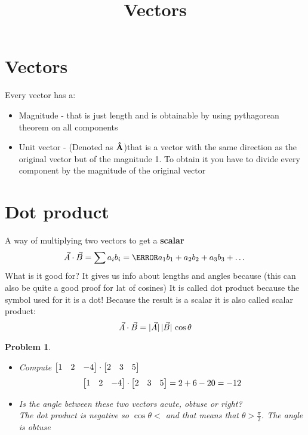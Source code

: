 \documentclass{article}
\begin{document}
    \title{Vectors}
    \maketitle


    \section{Vectors}

    Every vector has a:
    \begin{itemize}
        \item Magnitude - that is just length and is obtainable by using pythagorean theorem on all components
        \item Unit vector - (Denoted as $\vu{A}$)that is a vector with the same direction as the original vector but of the magnitude 1. To obtain it you have to divide every component by the magnitude of the original vector
    \end{itemize}

    \section{Dot product}

    A way of multiplying two vectors to get a \textbf{scalar}
    \[\vec{A}\cdot\vec{B}=\sum{a_ib_i}=\cancel{a_1b_1}+a_2b_2+a_3b_3+\dots\]
    What is it good for? It gives us info about lengths and angles because (this can also be quite a good proof for lat of cosines) It is called dot product because the symbol used for it is a dot! Because the result is a scalar it is also called scalar product:
    \[\vec{A}\cdot\vec{B}=\abs*{\vec{A}}\abs*{\vec{B}}\cos{\theta}\]

    \newtheorem{exmp}{Example}
    \newtheorem{problem}{Problem}

    \begin{problem}
        \begin{itemize}
            \item[a)]Compute $\bmqty{1 & 2 & -4}\cdot\bmqty{2 & 3 & 5}$
            \[
                \bmqty{1 & 2 & -4}\cdot\bmqty{2 & 3 & 5}=2+6-20=-12
            \]
            \item[b)] Is the angle between these two vectors acute, obtuse or right?\\
            The dot product is negative so $\cos{\theta}<$ and that means that $\theta > \frac{\pi}{2}$. The angle is obtuse
        \end{itemize}
    \end{problem}
\end{document}
